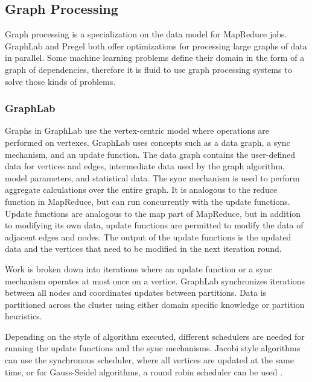 \documentclass[12pt]{article}
\begin{document}
\subsection{Graph Processing}

Graph processing is a specialization on the data model for MapReduce jobs. GraphLab \cite{low2012graphlab} and Pregel \cite{malewicz2010pregel} both offer optimizations for processing large graphs of data in parallel. Some machine learning problems define their domain in the form of a graph of dependencies, therefore it is fluid to use graph processing systems to solve those kinds of problems.


\subsubsection{GraphLab}

Graphs in GraphLab \cite{low2012graphlab} use the vertex-centric model where operations are performed on vertexes. GraphLab uses concepts such as a data graph, a sync mechanism, and an update function. The data graph contains the user-defined data for vertices and edges, intermediate data used by the graph algorithm, model parameters, and statistical data. The sync mechanism is used to perform aggregate calculations over the entire graph. It is analogous to the reduce function in MapReduce, but can run concurrently with the update functions. Update functions are analogous to the map part of MapReduce, but in addition to modifying its own data, update functions are permitted to modify the data of adjacent edges and nodes. The output of the update functions is the updated data and the vertices that need to be modified in the next iteration round.

Work is broken down into iterations where an update function or a sync mechanism operates at most once on a vertice. GraphLab synchronizes iterations between all nodes and coordinates updates between partitions. Data is partitioned across the cluster using either domain specific knowledge or partition heuristics.

Depending on the style of algorithm executed, different schedulers are needed for running the update functions and the sync mechanisms. Jacobi style algorithms can use the synchronous scheduler, where all vertices are updated at the same time, or for Gauss-Seidel algorithms, a round robin scheduler can be used \cite{zhang2016survey}.
\end{document}
